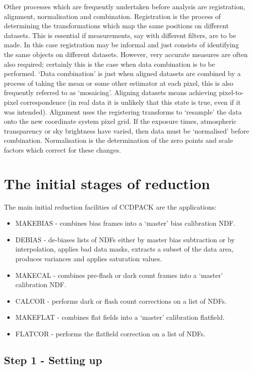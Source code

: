 Other processes which are frequently undertaken before analysis are
registration, alignment, normalisation and combination. Registration is
the process of determining the transformations which map the same
positions on different datasets. This is essential if measurements, say
with different filters, are to be made. In this case registration may be
informal and just consists of identifying the same objects on different
datasets. However, very accurate measures are often also required;
certainly this is the case when data combination is to be performed.
`Data combination' is just when aligned datasets are combined by a
process of taking the mean or some other estimator at each pixel, this
is also frequently referred to as `mosaicing'. Aligning datasets 
means achieving pixel-to-pixel correspondence (in real data it is
unlikely that this state is true, even if it was intended). Alignment 
uses the registering transforms to `resample' the data onto the new
coordinate system pixel grid. If the exposure times, atmospheric
transparency or sky brightness have varied, then data must be
`normalised' before combination. Normalisation is the  determination
of the zero points and scale factors which correct for these changes. 

\section{The initial stages of reduction}

The main initial reduction facilities of CCDPACK are the applications:
\begin{itemize}
\item MAKEBIAS - combines bias frames into a `master' bias calibration
NDF.
\item DEBIAS   - de-biases lists of NDFs either by master bias
subtraction or by interpolation, applies bad data masks, extracts a 
subset of the data area, produces variances and applies saturation
values.
\item MAKECAL  - combines pre-flash or dark count frames into a `master'
calibration NDF.
\item CALCOR   - performs dark or flash count corrections on a list of
NDFs.
\item MAKEFLAT - combines flat fields into a `master' calibration 
                 flatfield.
\item FLATCOR  - performs the flatfield correction on a list of NDFs.
\end{itemize}

\subsection{Step 1 - Setting up}
\label{CCDSETUP}

